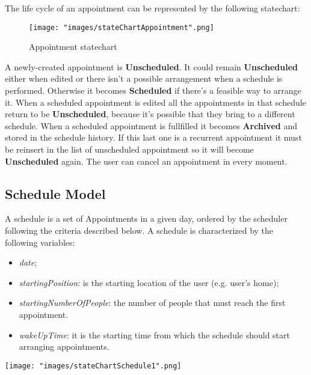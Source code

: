 The life cycle of an appointment can be represented by the following statechart:
\begin{figure}[H]
\begin{center}
\texttt{[image: "images/stateChartAppointment".png]}
\caption{Appointment statechart}
\label{fig:stchartApp}
\end{center}
\end{figure}

A newly-created appointment is \textbf{Unscheduled}. It could remain \textbf{Unscheduled} either when edited or there isn't a possible arrangement when a schedule is performed. Otherwise it becomes \textbf{Scheduled} if there's a feasible way to arrange it. When a scheduled appointment is edited all the appointments in that schedule return to be \textbf{Unscheduled}, because it's possible that they bring to a different schedule. When a scheduled appointment is fullfilled it becomes \textbf{Archived} and stored in the schedule history. If this last one is a recurrent appointment it must be reinsert in the list of unscheduled appointment so it will become \textbf{Unscheduled} again. The user can cancel an appointment in every moment. 

\subsection{Schedule Model} \label{subsect:schmodel}
A schedule is a set of Appointments in a given day, ordered by the scheduler following the criteria described below.
A schedule is characterized by the following variables:
\begin{itemize}
\item \textit{date};
\item \textit{startingPosition}: is the starting location of the user (e.g. user's home);
\item \textit{startingNumberOfPeople}: the number of people that must reach the first appointment.
\item \textit{wakeUpTime}: it is the starting time from which the schedule should start arranging appointments.
\end{itemize}

\texttt{[image: "images/stateChartSchedule1".png]}

